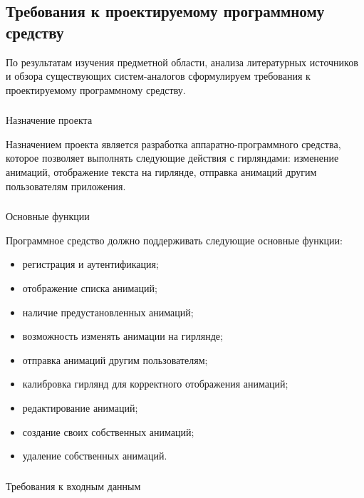 \subsection{Требования к проектируемому программному средству}
\label{sec:subject:specification}

По результатам изучения предметной области, анализа литературных источников и обзора существующих систем-аналогов сформулируем требования к проектируемому программному средству.

\subsubsection{} Назначение проекта
\label{sec:subject:specification:purpose}

Назначением проекта является разработка аппаратно-программного средства, которое позволяет выполнять следующие действия с гирляндами: изменение анимаций, отображение текста на гирлянде, отправка анимаций другим пользователям приложения.

\subsubsection{} Основные функции
\label{sec:subject:specification:functions}

Программное средство должно поддерживать следующие основные фун\-к\-ции:

\begin{itemize}
	\item регистрация и аутентификация;
	\item отображение списка анимаций;
	\item наличие предустановленных анимаций;
    \item возможность изменять анимации на гирлянде;
    \item отправка анимаций другим пользователям;
    \item калибровка гирлянд для корректного отображения анимаций;
    \item редактирование анимаций;
    \item создание своих собственных анимаций;
    \item удаление собственных анимаций.
\end{itemize}

\subsubsection{} Требования к входным данным
\label{sec:subject:specification:inputs}


